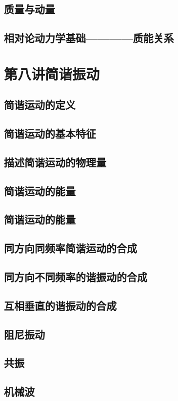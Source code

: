 \documentclass[UTF8]{article}
\begin{document}
\subsection{质量与动量}
\subsection{相对论动力学基础————质能关系}
\newpage
\section{第八讲\;\;简谐振动}
\subsection{简谐运动的定义}
\subsection{简谐运动的基本特征}
\subsection{描述简谐运动的物理量}
\subsection{简谐运动的能量}
\subsection{简谐运动的能量}
\subsection{同方向同频率简谐运动的合成}
\subsection{同方向不同频率的谐振动的合成}
\subsection{互相垂直的谐振动的合成}
\subsection{阻尼振动}
\subsection{共振}
\subsection{机械波}
\end{document}

